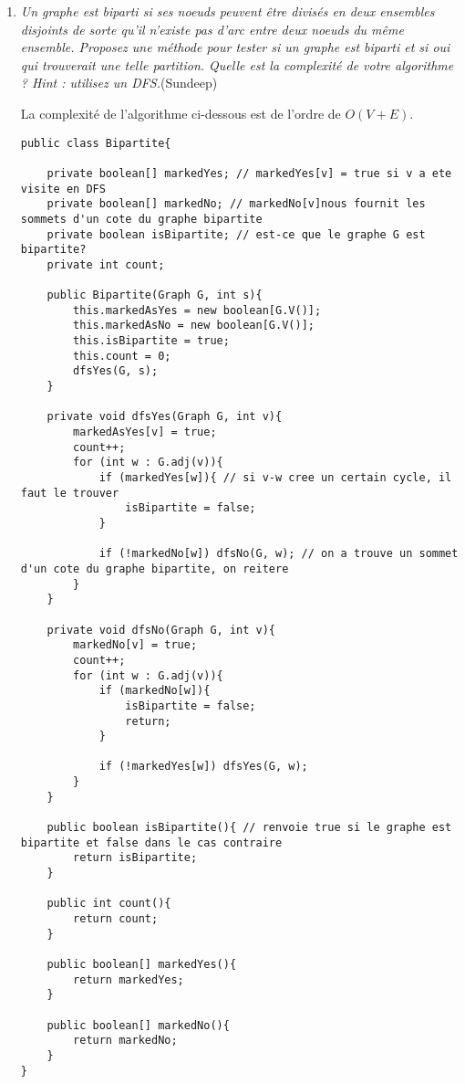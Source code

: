 \documentclass[11pt]{article}
\begin{document}
\begin{enumerate}
\item \textit{Un graphe est biparti si ses noeuds peuvent être divisés en deux ensembles disjoints de sorte qu’il n’existe pas d’arc entre deux noeuds du même ensemble.
Proposez une méthode pour tester si un graphe est biparti et si oui qui trouverait
une telle partition. Quelle est la complexité de votre algorithme ? Hint : utilisez
un DFS.}(Sundeep) \medskip

La complexité de l'algorithme ci-dessous est de l'ordre de $O(V+E)$.\\
\begin{lstlisting}
public class Bipartite{
    
    private boolean[] markedYes; // markedYes[v] = true si v a ete visite en DFS
    private boolean[] markedNo; // markedNo[v]nous fournit les sommets d'un cote du graphe bipartite
    private boolean isBipartite; // est-ce que le graphe G est bipartite?
    private int count;
    
    public Bipartite(Graph G, int s){
        this.markedAsYes = new boolean[G.V()];
        this.markedAsNo = new boolean[G.V()];
        this.isBipartite = true;
        this.count = 0;        
        dfsYes(G, s);
    }
    
    private void dfsYes(Graph G, int v){
        markedAsYes[v] = true;
        count++;
        for (int w : G.adj(v)){
            if (markedYes[w]){ // si v-w cree un certain cycle, il faut le trouver
                isBipartite = false;
            }
                
            if (!markedNo[w]) dfsNo(G, w); // on a trouve un sommet d'un cote du graphe bipartite, on reitere
        }
    }

    private void dfsNo(Graph G, int v){
        markedNo[v] = true;
        count++;
        for (int w : G.adj(v)){
            if (markedNo[w]){
                isBipartite = false;
                return;
            }
            
            if (!markedYes[w]) dfsYes(G, w);
        }
    }
    
    public boolean isBipartite(){ // renvoie true si le graphe est bipartite et false dans le cas contraire
        return isBipartite;
    }
    
    public int count(){
        return count;
    }
    
    public boolean[] markedYes(){
        return markedYes;
    }
    
    public boolean[] markedNo(){
        return markedNo;
    }
}
\end{lstlisting}


\end{enumerate}
\end{document}
